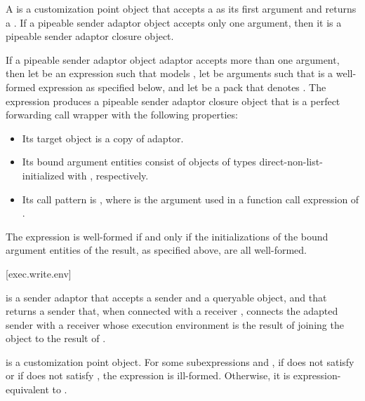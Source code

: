 \pnum
A  is a customization point object
that accepts a  as its first argument and
returns a .
If a pipeable sender adaptor object accepts only one argument,
then it is a pipeable sender adaptor closure object.

\pnum
If a pipeable sender adaptor object adaptor accepts more than one argument,
then let  be an expression
such that  models ,
let  be arguments
such that  is a well-formed expression
as specified below, and
let  be a pack that denotes .
The expression  produces
a pipeable sender adaptor closure object 
that is a perfect forwarding call wrapper with the following properties:
\begin{itemize}
\item
Its target object is a copy of adaptor.
\item
Its bound argument entities  consist of
objects of types  direct-non-list-initialized with
, respectively.
\item
Its call pattern is ,
where  is
the argument used in a function call expression of .
\end{itemize}
The expression  is well-formed if and only if
the initializations of the bound argument entities of the result,
as specified above, are all well-formed.

[exec.write.env]{}

\pnum
{} is a sender adaptor
that accepts a sender and a queryable object, and
that returns a sender that,
when connected with a receiver ,
connects the adapted sender with a receiver
whose execution environment is the result of
joining the  object
to the result of .

\pnum
{} is a customization point object.
For some subexpressions  and ,
if  does not satisfy  or
if  does not satisfy ,
the expression  is ill-formed.
Otherwise, it is expression-equivalent to
.

